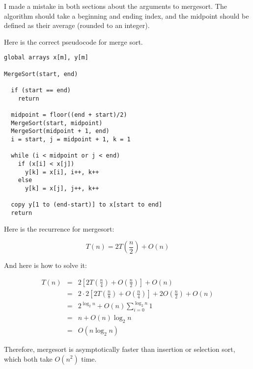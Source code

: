 \documentclass{article}[10pth]
\begin{document}
\begin{enumerate}
I made a mistake in both sections about the arguments to mergesort.
The algorithm
should take a beginning and ending index, and the midpoint should be
defined as their average (rounded to an integer).

Here is the correct pseudocode for merge sort.

\begin{verbatim}
global arrays x[m], y[m]

MergeSort(start, end)

  if (start == end)
    return

  midpoint = floor((end + start)/2)
  MergeSort(start, midpoint)
  MergeSort(midpoint + 1, end)
  i = start, j = midpoint + 1, k = 1

  while (i < midpoint or j < end)
    if (x[i] < x[j])
      y[k] = x[i], i++, k++
    else
      y[k] = x[j], j++, k++

  copy y[1 to (end-start)] to x[start to end]
  return
\end{verbatim}

Here is the recurrence for mergesort:

\begin{equation}
T(n)= 2T(\frac{n}{2}) + O(n)
\end{equation}

And here is how to solve it:

\begin{eqnarray}
T(n) & = & 2 [ 2 T(\frac{n}{4}) + O(\frac{n}{2})] + O(n)\\
     & = & 2\cdot 2 [ 2 T(\frac{n}{8}) + O(\frac{n}{4}) ] + 2O(\frac{n}{2}) + O(n)\\
     & = & 2^{\log_2{n}} + O(n) \sum_{i=0}^{\log_2{n}}1\\
     & = & n + O(n) \log_2{n}\\
     & = & O(n\log_2{n})
\end{eqnarray}

Therefore, mergesort is asymptotically faster than insertion or selection
sort, which both take $O(n^2)$ time.

\end{enumerate}
\end{document}
